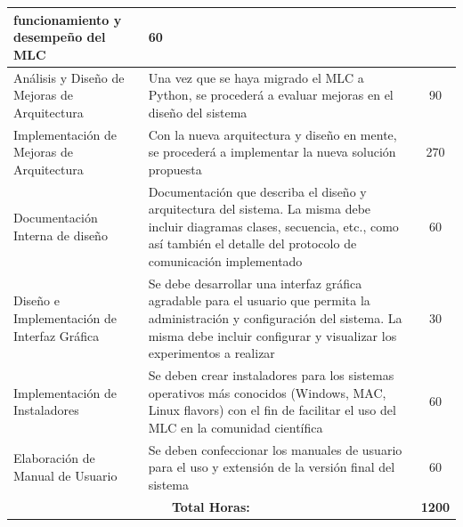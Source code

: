 \documentclass[a4paper,10pt]{article}
\begin{document}
\begin{center}
\begin{longtable}{|p{3.5cm}|p{7cm}|c|}
            funcionamiento y desempeño del MLC & 60 \\
            \hline
            Análisis y Diseño de Mejoras de Arquitectura & Una vez que se haya migrado el MLC a Python, se procederá a evaluar
            mejoras en el diseño del sistema & 90 \\
            \hline
            Implementación de Mejoras de Arquitectura & Con la nueva arquitectura y diseño en mente, se procederá a implementar
            la nueva solución propuesta & 270 \\
            \hline
            Documentación Interna de diseño & Documentación que describa el diseño y arquitectura del sistema. La misma debe incluir
            diagramas clases, secuencia, etc., como así también el detalle del protocolo de comunicación implementado & 60 \\
            \hline
            Diseño e Implementación de Interfaz Gráfica & Se debe desarrollar una interfaz gráfica agradable para el usuario que permita
            la administración y configuración del sistema. La misma debe incluir configurar y visualizar los experimentos a realizar
            & 30 \\
            \hline
            Implementación de Instaladores & Se deben crear instaladores para los sistemas operativos más conocidos
            (Windows, MAC, Linux flavors) con el fin de facilitar el uso del MLC en la comunidad científica & 60 \\
            \hline
            Elaboración de Manual de Usuario & Se deben confeccionar los manuales de usuario para el uso y extensión de la versión final
            del sistema & 60 \\
            \hline
            \multicolumn{2}{|c|}{\textbf{Total Horas:}} & \textbf{1200} \\
            \hline
        \end{longtable}
        \end{center}

    \newpage
     
    
\end{document}
